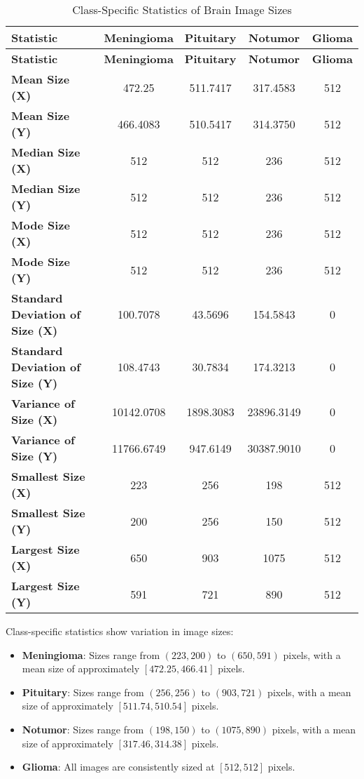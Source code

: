 \begin{longtable}{|l|c|c|c|c|}
\caption{Class-Specific Statistics of Brain Image Sizes}\\
\hline
\textbf{Statistic} & \textbf{Meningioma} & \textbf{Pituitary} & \textbf{Notumor} & \textbf{Glioma} \\
\hline
\endfirsthead
\hline
\textbf{Statistic} & \textbf{Meningioma} & \textbf{Pituitary} & \textbf{Notumor} & \textbf{Glioma} \\
\hline
\endhead
\hline
\endfoot
\endlastfoot
\textbf{Mean Size (X)} & 472.25 & 511.7417 & 317.4583 & 512 \\
\hline
\textbf{Mean Size (Y)} & 466.4083 & 510.5417 & 314.3750 & 512 \\
\hline
\textbf{Median Size (X)} & 512 & 512 & 236 & 512 \\
\hline
\textbf{Median Size (Y)} & 512 & 512 & 236 & 512 \\
\hline
\textbf{Mode Size (X)} & 512 & 512 & 236 & 512 \\
\hline
\textbf{Mode Size (Y)} & 512 & 512 & 236 & 512 \\
\hline
\textbf{Standard Deviation of Size (X)} & 100.7078 & 43.5696 & 154.5843 & 0 \\
\hline
\textbf{Standard Deviation of Size (Y)} & 108.4743 & 30.7834 & 174.3213 & 0 \\
\hline
\textbf{Variance of Size (X)} & 10142.0708 & 1898.3083 & 23896.3149 & 0 \\
\hline
\textbf{Variance of Size (Y)} & 11766.6749 & 947.6149 & 30387.9010 & 0 \\
\hline
\textbf{Smallest Size (X)} & 223 & 256 & 198 & 512 \\
\hline
\textbf{Smallest Size (Y)} & 200 & 256 & 150 & 512 \\
\hline
\textbf{Largest Size (X)} & 650 & 903 & 1075 & 512 \\
\hline
\textbf{Largest Size (Y)} & 591 & 721 & 890 & 512 \\
\hline
\end{longtable}

Class-specific statistics show variation in image sizes:
\begin{itemize}
    \item \textbf{Meningioma}: Sizes range from $(223, 200)$ to $(650, 591)$ pixels, with a mean size of approximately $[472.25, 466.41]$ pixels.
    \item \textbf{Pituitary}: Sizes range from $(256, 256)$ to $(903, 721)$ pixels, with a mean size of approximately $[511.74, 510.54]$ pixels.
    \item \textbf{Notumor}: Sizes range from $(198, 150)$ to $(1075, 890)$ pixels, with a mean size of approximately $[317.46, 314.38]$ pixels.
    \item \textbf{Glioma}: All images are consistently sized at $[512, 512]$ pixels.
\end{itemize}

